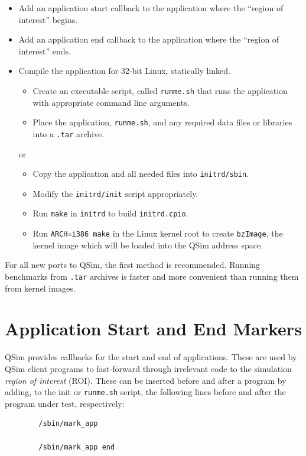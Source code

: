 \documentclass[letterpaper, 10pt]{book}
\begin{document}
\begin{itemize}
  \item{Add an application start callback to the application where the ``region
        of interest'' begins.}
  \item{Add an application end callback to the application where the ``region of
        interest'' ends.}
  \item{
    Compile the application for 32-bit Linux, statically linked.
    \begin{itemize}
      \item{Create an executable script, called \texttt{runme.sh} that runs the
            application with appropriate command line arguments.}
      \item{Place the application, \texttt{runme.sh}, and any required data
            files or libraries into a \texttt{.tar} archive.}
    \end{itemize}
    or
    \begin{itemize}
      \item{Copy the application and all needed files into
            \texttt{initrd/sbin}.}
      \item{Modify the \texttt{initrd/init} script appropriately.}
      \item{Run \texttt{make} in \texttt{initrd} to build \texttt{initrd.cpio}.}
      \item{Run \texttt{ARCH=i386 make} in the Linux kernel root to create 
            \texttt{bzImage}, the kernel image which will be loaded into the
            QSim address space.}
    \end{itemize}
    }
\end{itemize}

For all new ports to QSim, the first method is recommended. Running benchmarks
from \texttt{.tar} archives is faster and more convenient than running them from
kernel images.

\section{Application Start and End Markers}
QSim provides callbacks for the start and end of applications. These are used by
QSim client programs to fast-forward through irrelevant code to the simulation
\textit{region of interest} (ROI). These can be inserted before and after a
program by adding, to the init or \texttt{runme.sh} script, the following lines
before and after the program under test, respectively:

\begin{verbatim}
        /sbin/mark_app

        /sbin/mark_app end
\end{verbatim}
\end{document}
